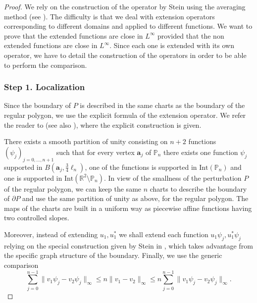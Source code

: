 \documentclass[11pt]{article}
\numberwithin{equation}{section}\newtheorem*{jepEnonce}{\jepEnonceTitle}\newenvironment{enonce*}[1]{\def\jepEnonceTitle{#1}\jepEnonce}{\endjepEnonce}\newtheorem*{conj*}{Conjecture}
\theoremstyle{plain}
\theoremstyle{definition}
\newcommand{\bo}[1]{{\boldsymbol#1}}
\let\Bbb\mathbb
\def\R{\mathbb{R}}
\begin{document}
\begin{proof}

We rely on the construction of the operator by Stein using the averaging method (see \cite[Th.\,5, p.\,181]{St70}). The difficulty is that we deal with extension operators corresponding to different domains and applied to different functions. We want to prove that the extended functions are close in $L^\infty$ provided that the non extended functions are close in $L^\infty$. Since each one is extended with its own operator, we have to detail the construction of the operators in order to be able to perform the comparison.

\subsubsection*{Step 1. Localization}
Since the boundary of $P$ is described in the same charts as the boundary of the regular polygon, we use the explicit formula of the extension operator. We refer the reader to \cite[Th.\,5, p.\,181]{St70} (see also \cite{LaVi19,HLZ12}), where the explicit construction is given.

There exists a smooth partition of unity consisting on $n+2$ functions $(\psi_j)_{j=0, \dots, n+1}$ such that for every vertex $\bo a_j$ of $\Bbb P_n$ there exists one function $\psi_j$ supported in $B(\bo a_j, \frac34 \ell_n)$, one of the functions is supported in $\text{Int}(\Bbb P_n)$ and one is supported in $\text{Int}(\R^2 \setminus \Bbb P_n)$.
In view of the smallness of the perturbation $P$ of the regular polygon, we can keep the same $n$ charts to describe the boundary of $\partial P$ and use the same partition of unity as above, for the regular polygon.
The maps of the charts are built in a uniform way as piecewise affine functions having two controlled slopes.

Moreover, instead of extending $u_1, u_1^*$ we shall extend each function $u_1\psi_j, u_1^*\psi_j$ relying on the special construction given by Stein in \cite[Th.\,5, p.\,181]{St70}, which takes advantage from the specific graph structure of the boundary. Finally, we use the generic comparison
\[
\sum_{j=0}^{n-1} \| v_1\psi_j -v_2\psi_j\|_\infty \le n \| v_1 -v_2 \|_\infty \le n \sum_{j=0}^{n-1} \| v_1\psi_j -v_2\psi_j\|_\infty.
\]


\end{proof}
\end{document}
